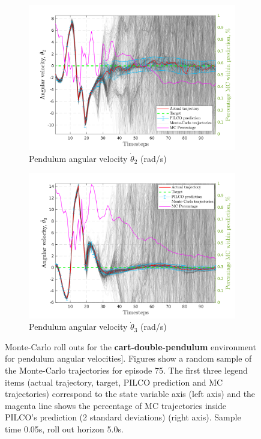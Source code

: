  
\begin{figure}[H]    
   \begin{subfigure}[b]{1\linewidth}
    \centering
    \includegraphics[height=0.4\textheight,width=1\textwidth]{Chapter3/Figures/cdp_MC_rollout_Ep_80_Dim_3.png} 
    \caption{Pendulum angular velocity $\dot{\theta}_2$ (rad/s)} 
    \label{Fig:Re-cdp-pen2-velocity} 
  \end{subfigure} 
  \hspace{\fill}
  \begin{subfigure}[b]{1\linewidth}
    \centering
    \includegraphics[height=0.4\textheight,width=1\textwidth]{Chapter3/Figures/cdp_MC_rollout_Ep_80_Dim_4.png} 
    \caption{Pendulum angular velocity $\dot{\theta}_3$ (rad/s)} 
    \label{Fig:Re-cdp-pen3-velocity} 
  \end{subfigure} 

\caption[Monte-Carlo roll outs for \textbf{cart-double-pendulum} pendulum angular velocities]{Monte-Carlo roll outs for the \textbf{cart-double-pendulum} environment for  pendulum angular velocities]. Figures show a random sample of the Monte-Carlo trajectories for episode 75. The first three legend items (actual trajectory, target, PILCO prediction and MC trajectories) correspond to the state variable axis (left axis) and the magenta line shows the percentage of MC trajectories inside PILCO's prediction (2 standard deviations) (right axis). Sample time 0.05s, roll out horizon 5.0s.}
\label{Fig:Re-cdp-MC-roll-outs-2} 
\end{figure}
 
